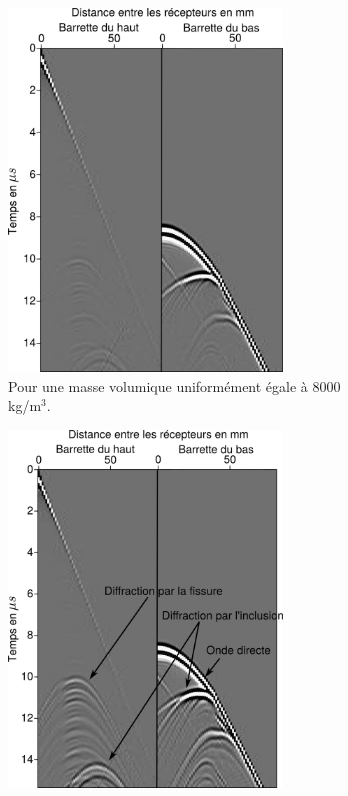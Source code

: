 \begin{figure}[!h]
	\centering
	\begin{subfigure}[b]{0.45\textwidth}
		\centering
		\includegraphics[width=0.8\textwidth]{img/rho_sur_donnees/data_rho_uni.png}
		\caption{Pour une masse volumique uniformément égale à 8000 kg/m$^{3}$.}
	\end{subfigure}
		\begin{subfigure}[b]{0.45\textwidth}
		\centering
		\includegraphics[width=0.8\textwidth]{img/rho_sur_donnees/data_rho_vrai.png}

\end{subfigure}
\end{figure}
